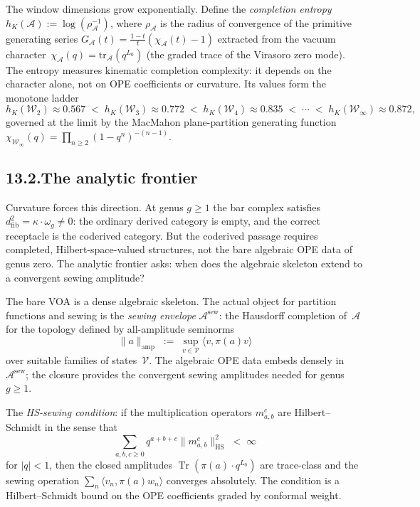 \documentclass[11pt]{report}
\theoremstyle{definition}
\theoremstyle{remark}
\providecommand{\cA}{\mathcal{A}}
\providecommand{\cV}{\mathcal{V}}
\numberwithin{equation}{section}
\begin{document}
The window dimensions grow exponentially. Define the
\emph{completion entropy} $h_K(\cA) := \log(\rho_\cA^{-1})$,
where $\rho_\cA$ is the radius of convergence of the
primitive generating series
$G_\cA(t) = \tfrac{1-t}{t}(\chi_\cA(t) - 1)$ extracted
from the vacuum character~$\chi_\cA(q)=\mathrm{tr}_\cA(q^{L_0})$
(the graded trace of the Virasoro zero mode). The entropy
measures kinematic completion complexity: it depends on the
character alone, not on OPE coefficients or curvature. Its values
form the monotone ladder
\[
h_K(\mathcal{W}_2) \approx 0.567
\;<\; h_K(\mathcal{W}_3) \approx 0.772
\;<\; h_K(\mathcal{W}_4) \approx 0.835
\;<\; \cdots
\;<\; h_K(\mathcal{W}_\infty) \approx 0.872,
\]
governed at the limit by the MacMahon plane-partition generating
function $\chi_{\mathcal{W}_\infty}(q) = \prod_{n \ge 2}(1 -
q^n)^{-(n-1)}$.

\subsection*{13.2.\enspace The analytic frontier}

Curvature forces this direction. At genus $g \ge 1$ the bar
complex satisfies $d_{\mathrm{fib}}^2 = \kappa \cdot \omega_g
\neq 0$: the ordinary derived category is empty, and the correct
receptacle is the coderived category. But the coderived passage
requires completed, Hilbert-space-valued structures, not the
bare algebraic OPE data of genus zero. The analytic frontier asks:
when does the algebraic skeleton extend to a convergent sewing
amplitude?

The bare VOA is a dense algebraic skeleton. The actual object for
partition functions and sewing is the \emph{sewing envelope}
$\cA^{\mathrm{sew}}$: the Hausdorff completion of~$\cA$ for the
topology defined by all-amplitude seminorms
\[
\|a\|_{\mathrm{amp}}
\;:=\;
\sup_{v\in\cV}\langle v,\pi(a)v\rangle
\]
over suitable families of states~$\cV$. The algebraic OPE data
embeds densely in $\cA^{\mathrm{sew}}$; the closure provides the
convergent sewing amplitudes needed for genus $g\ge 1$.

The \emph{HS-sewing condition}: if the multiplication operators
$m^c_{a,b}$ are Hilbert--Schmidt in the sense that
\[
\sum_{a,b,c\ge 0}q^{a+b+c}\|m^c_{a,b}\|^2_{\mathrm{HS}}
\;<\;\infty
\]
for $|q|<1$, then the closed amplitudes
$\operatorname{Tr}(\pi(a)\cdot q^{L_0})$ are trace-class and
the sewing operation $\sum_n\langle v_n,\pi(a)w_n\rangle$ converges
absolutely. The condition is a Hilbert--Schmidt bound on the
OPE coefficients graded by conformal weight.
\end{document}
